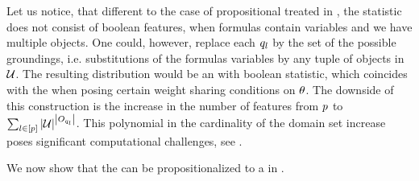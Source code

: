 
Let us notice, that different to the case of propositional \HybridLogicNetworks{} treated in , the statistic does not consist of boolean features, when formulas contain variables and we have multiple objects.
One could, however, replace each $q_{l}$ by the set of the possible groundings, i.e. substitutions of the formulas variables by any tuple of objects in $\mathcal{U}$.
The resulting distribution would be an \HybridLogicNetwork{} with boolean statistic, which coincides with the \HybridFOLNetwork{} when posing certain weight sharing conditions on $\theta$.
The downside of this construction is the increase in the number of features from $p$ to $\sum_{l\in[p]} \left|\mathcal{U}\right|^{\left|O_{q_{l}}\right|}$.
This polynomial in the cardinality of the domain set increase poses significant computational challenges, see \cite{richardson_markov_2006}.

We now show that the \HybridFOLNetwork{} can be propositionalized to a \HybridLogicNetwork{} in \propositionalLogic{}.

